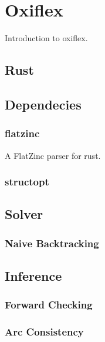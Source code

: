 
\chapter{Oxiflex}

Introduction to oxiflex.

\section{Rust}

\section{Dependecies}

\subsection{flatzinc}

A FlatZinc parser for rust.

\subsection{structopt}

\section{Solver}

\subsection{Naive Backtracking}

\section{Inference}

\subsection{Forward Checking}

\subsection{Arc Consistency}


